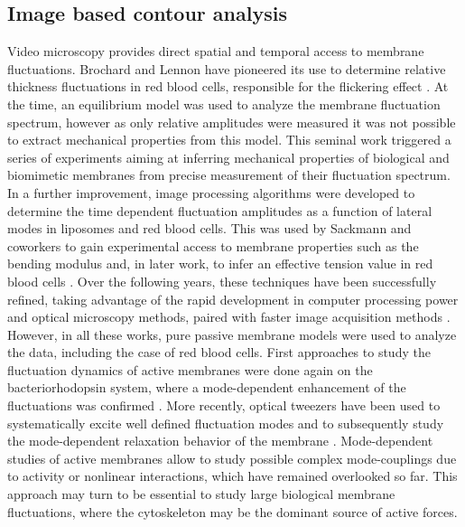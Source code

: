 \documentclass[graybox]{svmult}
\begin{document}
	\subsection{Image based contour analysis}
Video microscopy provides direct spatial and temporal access to membrane fluctuations. Brochard and Lennon have pioneered its use to determine relative thickness fluctuations in red blood cells, responsible for the flickering effect \cite{Brochard:1975}.  At the time, an equilibrium model was used to analyze the membrane fluctuation spectrum, however as only relative amplitudes were measured it was not possible to extract mechanical properties from this model. This seminal work triggered a series of experiments aiming at inferring mechanical properties of biological and biomimetic membranes from precise measurement of their fluctuation spectrum. In a further improvement, image processing algorithms were developed to determine the time dependent fluctuation amplitudes as a function of lateral modes in liposomes and red blood cells. This was used by Sackmann and coworkers to gain experimental access to membrane properties such as the bending modulus and, in later work, to infer an effective tension value in red blood cells \cite{Zilker:1992, Strey:1995}. Over the following years, these techniques have been successfully refined, taking advantage of the rapid development in computer processing power and optical microscopy methods, paired with faster image acquisition methods \cite{Pecreaux:2004}. However, in all these works, pure passive membrane models were used to analyze the data, including the case of red blood cells. First approaches to study the fluctuation dynamics of active membranes were done again on the bacteriorhodopsin system, where a mode-dependent enhancement of the fluctuations was confirmed \cite{Faris:2009}. 
More recently, optical tweezers have been used to systematically excite well defined fluctuation modes and to subsequently study the mode-dependent relaxation behavior of the membrane \cite{Brown:2011}. Mode-dependent studies of active membranes allow to study possible complex mode-couplings due to activity or nonlinear interactions, which have remained overlooked so far. This approach may turn to be essential to study large biological membrane fluctuations, where the cytoskeleton may be the dominant source of active forces.
  
\end{document}
